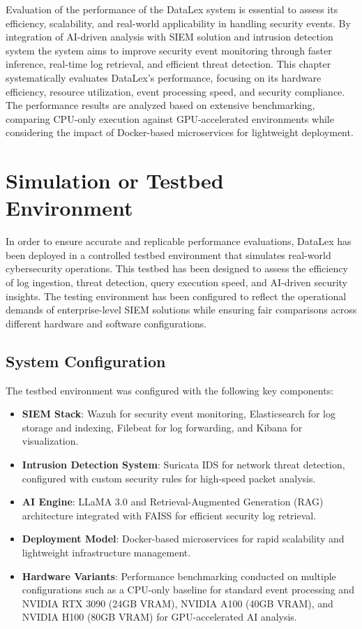 Evaluation of the performance of the DataLex system is essential to assess its efficiency, scalability, and real-world applicability in handling security events. By integration of AI-driven analysis with SIEM solution and intrusion detection system the system aims to improve security event monitoring through faster inference, real-time log retrieval, and efficient threat detection. This chapter systematically evaluates DataLex's performance, focusing on its hardware efficiency, resource utilization, event processing speed, and security compliance. The performance results are analyzed based on extensive benchmarking, comparing CPU-only execution against GPU-accelerated environments while considering the impact of Docker-based microservices for lightweight deployment.

\section{Simulation or Testbed Environment}
\label{sec_simulation_or_testbed_environment}

In order to ensure accurate and replicable performance evaluations, DataLex has been deployed in a controlled testbed environment that simulates real-world cybersecurity operations. This testbed has been designed to assess the efficiency of log ingestion, threat detection, query execution speed, and AI-driven security insights. The testing environment has been configured to reflect the operational demands of enterprise-level SIEM solutions while ensuring fair comparisons across different hardware and software configurations.

\subsection{System Configuration}
\label{subsec_system_configuration}

The testbed environment was configured with the following key components:

\begin{itemize}
    \item \textbf{SIEM Stack}: Wazuh for security event monitoring, Elasticsearch for log storage and indexing, Filebeat for log forwarding, and Kibana for visualization.
    \item \textbf{Intrusion Detection System}: Suricata IDS for network threat detection, configured with custom security rules for high-speed packet analysis.
    \item \textbf{AI Engine}: LLaMA 3.0 and Retrieval-Augmented Generation (RAG) architecture integrated with FAISS for efficient security log retrieval.
    \item \textbf{Deployment Model}: Docker-based microservices for rapid scalability and lightweight infrastructure management.
    \item \textbf{Hardware Variants}: Performance benchmarking conducted on multiple configurations such as a CPU-only baseline for standard event processing and NVIDIA RTX 3090 (24GB VRAM), NVIDIA A100 (40GB VRAM), and NVIDIA H100 (80GB VRAM) for GPU-accelerated AI analysis.
\end{itemize}

